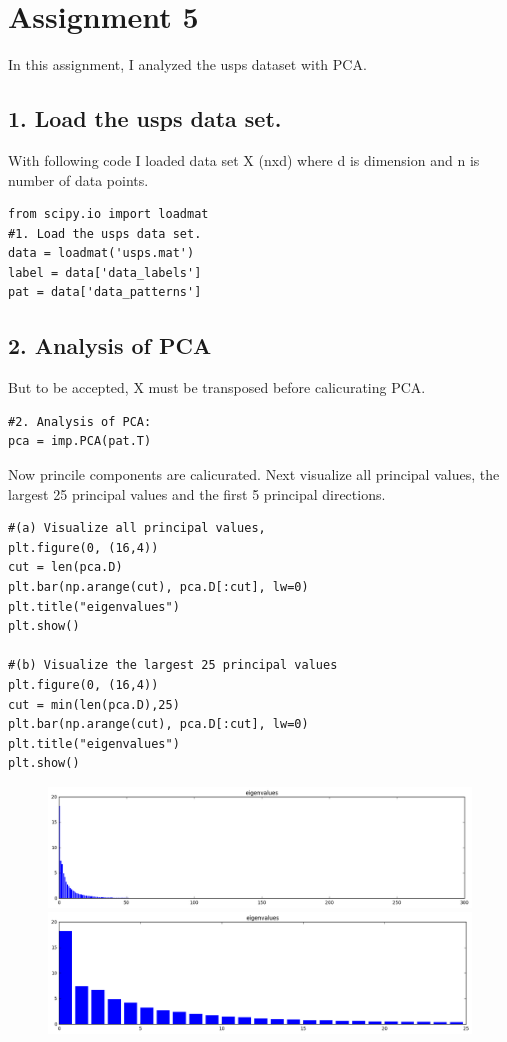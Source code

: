\documentclass[a4paper,11pt]{article}
\begin{document}
\section*{Assignment 5}
In this assignment, I analyzed the usps dataset with PCA.
\subsection*{1. Load the usps data set.}
With following code I loaded data set X (nxd) where d is dimension and n is number of data points.
\begin{verbatim}
from scipy.io import loadmat
#1. Load the usps data set.
data = loadmat('usps.mat') 
label = data['data_labels']
pat = data['data_patterns']
\end{verbatim}
\subsection*{2. Analysis of PCA}

But to be accepted, X must be transposed before calicurating PCA.
\begin{verbatim}
#2. Analysis of PCA:
pca = imp.PCA(pat.T)
\end{verbatim}
Now princile components are calicurated.
Next visualize all principal values, the largest 25 principal values and the first 5 principal directions.

\begin{verbatim}
#(a) Visualize all principal values,
plt.figure(0, (16,4))
cut = len(pca.D)
plt.bar(np.arange(cut), pca.D[:cut], lw=0)
plt.title("eigenvalues")
plt.show()

#(b) Visualize the largest 25 principal values 
plt.figure(0, (16,4))
cut = min(len(pca.D),25)
plt.bar(np.arange(cut), pca.D[:cut], lw=0)
plt.title("eigenvalues")
plt.show()
\end{verbatim}

\begin{figure}[htbp]
  \includegraphics[scale=0.4]{allpc.png}
  \includegraphics[scale=0.4]{5pc.png}
\end{figure}
\end{document}
